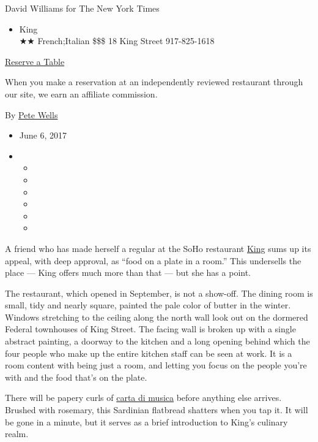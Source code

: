 David Williams for The New York Times

\begin{itemize}
\tightlist
\item
  King\\
  ★★ French;Italian \$\$\$ 18 King Street 917-825-1618
\end{itemize}

\href{https://resy.com/cities/ny/the-king?utm_source=nyt\&utm_medium=restoprofile\&utm_campaign=affiliates\&aff_id=c1fe784}{Reserve
a Table}

When you make a reservation at an independently reviewed restaurant
through our site, we earn an affiliate commission.

By \href{http://www.nytimes3xbfgragh.onion/by/pete-wells}{Pete Wells}

\begin{itemize}
\item
  June 6, 2017
\item
  \begin{itemize}
  \item
  \item
  \item
  \item
  \item
  \item
  \end{itemize}
\end{itemize}

A friend who has made herself a regular at the SoHo restaurant
\href{http://kingrestaurant.nyc/}{King} sums up its appeal, with deep
approval, as ``food on a plate in a room.'' This undersells the place
--- King offers much more than that --- but she has a point.

The restaurant, which opened in September, is not a show-off. The dining
room is small, tidy and nearly square, painted the pale color of butter
in the winter. Windows stretching to the ceiling along the north wall
look out on the dormered Federal townhouses of King Street. The facing
wall is broken up with a single abstract painting, a doorway to the
kitchen and a long opening behind which the four people who make up the
entire kitchen staff can be seen at work. It is a room content with
being just a room, and letting you focus on the people you're with and
the food that's on the plate.

There will be papery curls of
\href{http://www.nytimes3xbfgragh.onion/2010/03/24/dining/24mini.html}{carta
di musica} before anything else arrives. Brushed with rosemary, this
Sardinian flatbread shatters when you tap it. It will be gone in a
minute, but it serves as a brief introduction to King's culinary realm.

